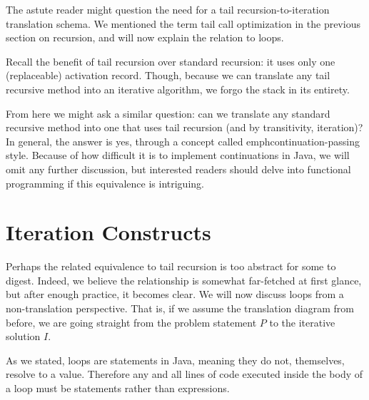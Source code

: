 The astute reader might question the need for a tail recursion-to-iteration translation schema. We mentioned the term tail call optimization in the previous section on recursion, and will now explain the relation to loops.

Recall the benefit of tail recursion over standard recursion: it uses only one (replaceable) activation record. Though, because we can translate any tail recursive method into an iterative algorithm, we forgo the stack in its entirety.

From here we might ask a similar question: can we translate any standard recursive method into one that uses tail recursion (and by transitivity, iteration)? In general, the answer is yes, through a concept called emph{continuation-passing style}. Because of how difficult it is to implement continuations in Java, we will omit any further discussion, but interested readers should delve into functional programming if this equivalence is intriguing.

\section{Iteration Constructs}

Perhaps the related equivalence to tail recursion is too abstract for some to digest. Indeed, we believe the relationship is somewhat far-fetched at first glance, but after enough practice, it becomes clear. We will now discuss loops from a non-translation perspective. That is, if we assume the translation diagram from before, we are going straight from the problem statement $P$ to the iterative solution $I$.

As we stated, loops are statements in Java, meaning they do not, themselves, resolve to a value. Therefore any and all lines of code executed inside the body of a loop must be statements rather than expressions.


